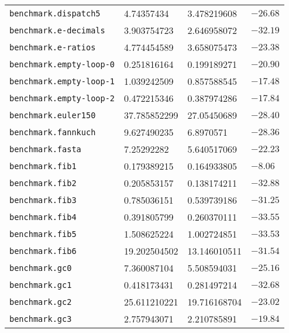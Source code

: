 \begin{longtable}{llll}
\texttt{benchmark.dispatch5}                & 4.74357434        & 3.478219608         & $-26.68$    \\
\texttt{benchmark.e-decimals}               & 3.903754723       & 2.646958072         & $-32.19$    \\
\texttt{benchmark.e-ratios}                 & 4.774454589       & 3.658075473         & $-23.38$    \\
\texttt{benchmark.empty-loop-0}             & 0.251816164       & 0.199189271         & $-20.90$    \\
\texttt{benchmark.empty-loop-1}             & 1.039242509       & 0.857588545         & $-17.48$    \\
\texttt{benchmark.empty-loop-2}             & 0.472215346       & 0.387974286         & $-17.84$    \\
\texttt{benchmark.euler150}                 & 37.785852299      & 27.05450689         & $-28.40$    \\
\texttt{benchmark.fannkuch}                 & 9.627490235       & 6.8970571           & $-28.36$    \\
\texttt{benchmark.fasta}                    & 7.25292282        & 5.640517069         & $-22.23$    \\
\texttt{benchmark.fib1}                     & 0.179389215       & 0.164933805         & $-8.06$     \\
\texttt{benchmark.fib2}                     & 0.205853157       & 0.138174211         & $-32.88$    \\
\texttt{benchmark.fib3}                     & 0.785036151       & 0.539739186         & $-31.25$    \\
\texttt{benchmark.fib4}                     & 0.391805799       & 0.260370111         & $-33.55$    \\
\texttt{benchmark.fib5}                     & 1.508625224       & 1.002724851         & $-33.53$    \\
\texttt{benchmark.fib6}                     & 19.202504502      & 13.146010511        & $-31.54$    \\
\texttt{benchmark.gc0}                      & 7.360087104       & 5.508594031         & $-25.16$    \\
\texttt{benchmark.gc1}                      & 0.418173431       & 0.281497214         & $-32.68$    \\
\texttt{benchmark.gc2}                      & 25.611210221      & 19.716168704        & $-23.02$    \\
\texttt{benchmark.gc3}                      & 2.757943071       & 2.210785891         & $-19.84$    \\

\end{longtable}

